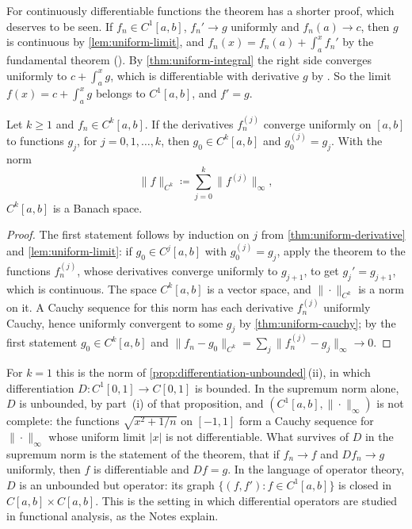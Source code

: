 For continuously differentiable functions the theorem has a shorter proof, which deserves to be seen. If $f_n\in C^1[a,b]$, $f_n'\to g$ uniformly and $f_n(a)\to c$, then $g$ is continuous by \cref{lem:uniform-limit}, and $f_n(x)=f_n(a)+\int_a^xf_n'$ by the fundamental theorem (). By \cref{thm:uniform-integral} the right side converges uniformly to $c+\int_a^xg$, which is differentiable with derivative $g$ by . So the limit $f(x)=c+\int_a^xg$ belongs to $C^1[a,b]$, and $f'=g$.

\begin{corollary}[Limits in $C^k$]
\label{cor:ck-limits}
Let $k\ge1$ and $f_n\in C^k[a,b]$. If the derivatives $f_n^{(j)}$ converge uniformly on $[a,b]$ to functions $g_j$, for $j=0,1,\ldots,k$, then $g_0\in C^k[a,b]$ and $g_0^{(j)}=g_j$. With the norm
\[
\|f\|_{C^k}\coloneqq\sum_{j=0}^k\|f^{(j)}\|_\infty ,
\]
$C^k[a,b]$ is a Banach space.
\end{corollary}

\begin{proof}
The first statement follows by induction on $j$ from \cref{thm:uniform-derivative} and \cref{lem:uniform-limit}: if $g_0\in C^{j}[a,b]$ with $g_0^{(j)}=g_j$, apply the theorem to the functions $f_n^{(j)}$, whose derivatives converge uniformly to $g_{j+1}$, to get $g_j'=g_{j+1}$, which is continuous. The space $C^k[a,b]$ is a vector space, and $\|\cdot\|_{C^k}$ is a norm on it. A Cauchy sequence for this norm has each derivative $f_n^{(j)}$ uniformly Cauchy, hence uniformly convergent to some $g_j$ by \cref{thm:uniform-cauchy}; by the first statement $g_0\in C^k[a,b]$ and $\|f_n-g_0\|_{C^k}=\sum_j\|f_n^{(j)}-g_j\|_\infty\to0$.
\end{proof}

For $k=1$ this is the norm of \cref{prop:differentiation-unbounded}\,(ii), in which differentiation $D\colon C^1[0,1]\to C[0,1]$ is bounded. In the supremum norm alone, $D$ is unbounded, by part~(i) of that proposition, and $(C^1[a,b],\|\cdot\|_\infty)$ is not complete: the functions $\sqrt{x^2+1/n}$ on $[-1,1]$ form a Cauchy sequence for $\|\cdot\|_\infty$ whose uniform limit $|x|$ is not differentiable. What survives of $D$ in the supremum norm is the statement of the theorem, that if $f_n\to f$ and $Df_n\to g$ uniformly, then $f$ is differentiable and $Df=g$. In the language of operator theory, $D$ is an unbounded but  operator: its graph $\{(f,f'): f\in C^1[a,b]\}$ is closed in $C[a,b]\times C[a,b]$. This is the setting in which differential operators are studied in functional analysis, as the Notes explain.

